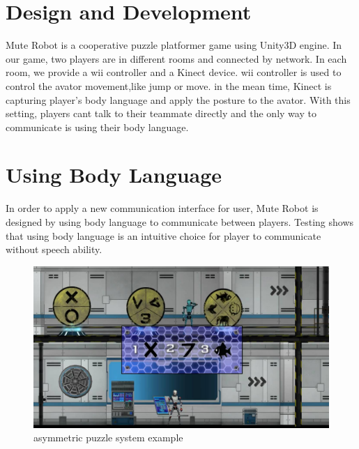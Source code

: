 \documentclass{chi-ext}
\begin{document}
 
  
\section{Design and Development}
Mute Robot is a cooperative puzzle platformer game using Unity3D engine\cite{Unity3D}. In our game, two players are in different rooms and connected by network. In each room, we provide a wii controller and a Kinect\cite{Kinect} device. wii\cite{Wii} controller is used to control the avator movement,like jump or move. in the mean time, Kinect is capturing player’s body language and apply the posture to the avator. With this setting, players cant talk to their teammate directly and the only way to communicate is using  their body language.





\section{Using Body Language}
In order to apply a new communication interface for user, Mute Robot is designed by using body language to communicate between players. Testing shows that using body language is an intuitive choice for player to communicate without speech ability.

\begin{figure}
  \centering
  \includegraphics[width=\linewidth]{figures/Figure1.jpg}
  \caption{asymmetric puzzle system example}
  \label{fig:Figure1}
\end{figure}
\end{document}
